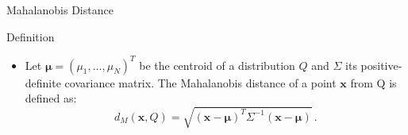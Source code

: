 \begin{frame}{Mahalanobis Distance}
  \begin{minipage}{0.47\textwidth}
      \centering
      \begin{definitionblock}{Definition}
          \begin{itemize}
              \item Let $\mathbf{\mu} = {(\mu_1, \dots, \mu_N)}^T$ be the centroid of a distribution $Q$ and $\Sigma$ its positive-definite covariance matrix. The Mahalanobis distance of a point $\mathbf{x}$ from Q is defined as:
              \[
                  d_M(\mathbf{x}, Q) = \sqrt{{(\mathbf{x}-\mathbf{\mu})}^T\Sigma^{-1}(\mathbf{x}-\mathbf{\mu})}\,.
              \]
          \end{itemize}
      \end{definitionblock}
  \vspace*{12px}
  \end{minipage}
  \quad
  \begin{minipage}{0.49\textwidth}
          \begin{figure}[h]
              \centering
\end{figure}
\end{minipage}
\end{frame}
